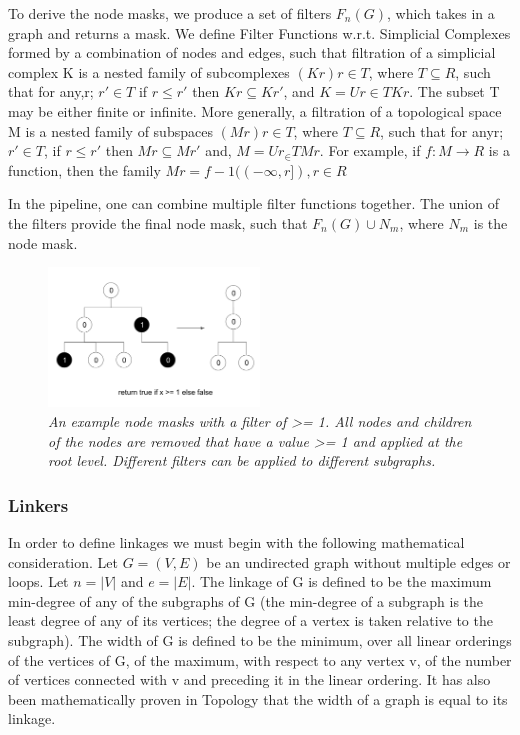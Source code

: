 To derive the node masks, we produce a set of filters $F_{n}(G)$, which takes in a graph and returns a mask. We define Filter Functions  w.r.t. Simplicial Complexes formed by a combination of nodes and edges, such that filtration of a simplicial complex K is a nested family of subcomplexes $(Kr)r \in T$, where $T \subseteq R$, such that for any,r; $r \prime \in T$  if $r \le r \prime$ then $Kr \subseteq Kr\prime$,  and  $K=Ur \in TKr$. The subset T may be either finite or infinite. More generally, a filtration of a topological space M is a nested family of subspaces $(Mr)r \in T$,  where $ T  \subseteq R $, such that for anyr; $r\prime \in T$, if $r \le r\prime$ then $Mr \subseteq Mr\prime$ and, $M=Ur_{\in}TMr$. For example, if $f : M \rightarrow R$ is a function, then the family $Mr = f-1 ((-\infty , r \rbrack), r \in R$ %

In the pipeline, one can combine multiple filter functions together. The union of the filters provide the final node mask, such that $ F_{n}(G) \cup N_{m}$, where $N_{m}$ is the node mask.

\begin{figure}
	\centering
        \includegraphics[width=0.5\textwidth]{images/nodemask.png}
	\caption{\textit{An example node masks with a filter of >= 1. All nodes and children of the nodes are removed that have a value >= 1 and applied at the root level. Different filters can be applied to different subgraphs.}}
	\label{fig:nodemask}
\end{figure}

\subsubsection{Linkers}

In order to define linkages we must begin with the following mathematical consideration. Let $G = (V, E)$ be an undirected graph without multiple edges or loops. Let $n =|V|$ and $e= |E|$. The linkage of G is defined to be the maximum min-degree of any of the subgraphs of G (the min-degree of a subgraph is the least degree of any of its vertices; the degree of a vertex is taken relative to the subgraph). The width of G is defined to be the minimum, over all linear orderings of the vertices of G, of the maximum, with respect to any vertex v, of the number of vertices connected with v and preceding it in the linear ordering. It has also been mathematically proven in Topology that the width of a graph is equal to its linkage.

